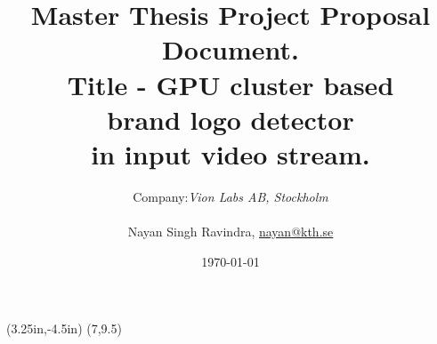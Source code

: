 \documentclass[12pt]{article}
\title{Master Thesis Project Proposal Document. \\ 
	Title - GPU cluster based \\ brand logo detector \\ in input video stream.}
\author{ Company:{\it  Vion Labs AB, Stockholm} 
	\\\\Nayan Singh Ravindra, \hyperlink{mailto:nayan@kth.se}{nayan@kth.se}}
\date{\today}
\begin{document}
	
	\thisfancyput(3.25in,-4.5in){%
		\setlength{\unitlength}{1in}\fancyoval(7,9.5)}%
	
	\maketitle
	\pagebreak
	\tableofcontents
	
	\printglossaries
	\printbibliography	
	
\end{document}
